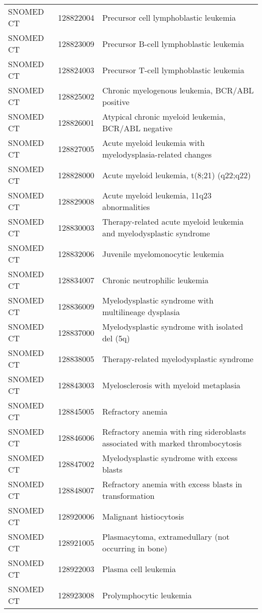 \begin{longtable}{p{}p{}p{}}
  SNOMED CT & 128822004 & Precursor cell lymphoblastic leukemia \\ 
  SNOMED CT & 128823009 & Precursor B-cell lymphoblastic leukemia \\ 
  SNOMED CT & 128824003 & Precursor T-cell lymphoblastic leukemia \\ 
  SNOMED CT & 128825002 & Chronic myelogenous leukemia, BCR/ABL positive \\ 
  SNOMED CT & 128826001 & Atypical chronic myeloid leukemia, BCR/ABL negative \\ 
  SNOMED CT & 128827005 & Acute myeloid leukemia with myelodysplasia-related changes \\ 
  SNOMED CT & 128828000 & Acute myeloid leukemia, t(8;21) (q22;q22) \\ 
  SNOMED CT & 128829008 & Acute myeloid leukemia, 11q23 abnormalities \\ 
  SNOMED CT & 128830003 & Therapy-related acute myeloid leukemia and myelodysplastic syndrome \\ 
  SNOMED CT & 128832006 & Juvenile myelomonocytic leukemia \\ 
  SNOMED CT & 128834007 & Chronic neutrophilic leukemia \\ 
  SNOMED CT & 128836009 & Myelodysplastic syndrome with multilineage dysplasia \\ 
  SNOMED CT & 128837000 & Myelodysplastic syndrome with isolated del (5q) \\ 
  SNOMED CT & 128838005 & Therapy-related myelodysplastic syndrome \\ 
  SNOMED CT & 128843003 & Myelosclerosis with myeloid metaplasia \\ 
  SNOMED CT & 128845005 & Refractory anemia \\ 
  SNOMED CT & 128846006 & Refractory anemia with ring sideroblasts associated with marked thrombocytosis \\ 
  SNOMED CT & 128847002 & Myelodysplastic syndrome with excess blasts \\ 
  SNOMED CT & 128848007 & Refractory anemia with excess blasts in transformation \\ 
  SNOMED CT & 128920006 & Malignant histiocytosis \\ 
  SNOMED CT & 128921005 & Plasmacytoma, extramedullary (not occurring in bone) \\ 
  SNOMED CT & 128922003 & Plasma cell leukemia \\ 
  SNOMED CT & 128923008 & Prolymphocytic leukemia \\ 

\end{longtable}
